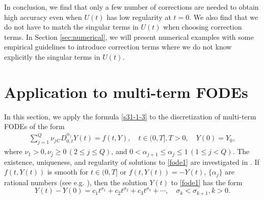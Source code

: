 \documentclass[10pt]{siamltex}
\begin{document}
In conclusion, we find that only a few number of corrections are needed to obtain high accuracy even when  $U(t)$ has low regularity at $t=0$. %
We also find that we do not have to match the singular terms in $U(t)$ when choosing correction terms.  In Section
\ref{sec:numerical}, we will present  numerical examples with some empirical guidelines to introduce correction terms where we do not know explicitly the singular terms in $U(t)$.


\section{Application to multi-term FODEs}\label{sec:multi-term-fode}
In this section, we apply the formula \eqref{s31-1-3} to the
discretization of multi-term  FODEs  of the form
\begin{eqnarray}
\sum_{j=1}^Q\nu_j {}_{C}D_{0,t}^{\alpha_j}Y(t)
 = f(t,Y),{\quad}t\in(0,T],T>0,{\quad}Y(0)=Y_0,\label{fode1}
\end{eqnarray}
where $\nu_1>0,\nu_j\geq0\,(2\leq j\leq Q)$, and $0<\alpha_{j+1}\leq\alpha_{j}\leq 1\,(1\leq j<Q)$.
The existence, uniqueness, and regularity of solutions to \eqref{fode1}
are investigated  in  \cite{Diethelm-B10,LiLiu14,Luchko11}.
If $f(t,Y(t))$ is smooth for $t\in(0,T]$ or $f(t,Y(t))=-Y(t)$, $\{\alpha_j\}$ are rational numbers
(see e.g. \cite{Diethelm-B10,JiangLiu-etal12b,JiangLiu-etal12,Luchko11}),
then the solution $Y(t)$ to \eqref{fode1} has the form
\begin{equation}\label{yt}
Y(t)-Y(0)=c_1t^{\sigma_1}+ c_{2}t^{\sigma_{2}}+ c_{3}t^{\sigma_{3}}+\cdots,{\quad}
\sigma_k<\sigma_{k+1},k>0.
\end{equation}
\end{document}
